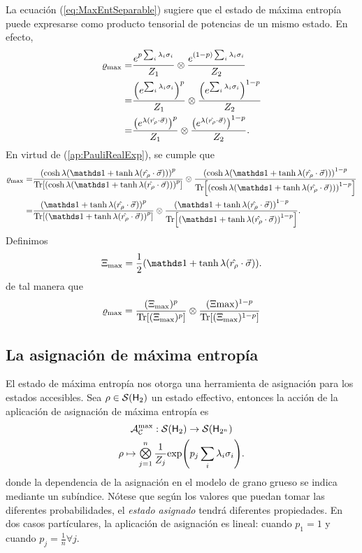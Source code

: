 
La ecuación (\ref{eq:MaxEntSeparable}) sugiere que el estado de máxima entropía puede expresarse como producto tensorial de potencias de un mismo estado. En efecto,
\begin{align*}
  \varrho_{\max}=&\frac{e^{p\sum_{i}\lambda_{i}\sigma_{i}}}{Z_{1}} \otimes \frac{e^{(1-p)\sum_{i}\lambda_{i}\sigma_{i}}}{Z_{2}}\\
  =&\frac{\qty(e^{\sum_{i}\lambda_{i}\sigma_{i}})^{p} }{Z_{1}}\otimes \frac{\qty(e^{\sum_{i}\lambda_{i}\sigma_{i}})^{1-p}}{Z_{2}}\\
  =&\frac{\qty(e^{\lambda(\hat{r_{\rho}}\cdot\vec{\sigma})})^{p}}{Z_{1}} \otimes \frac{\qty(e^{\lambda(\hat{r_{\rho}}\cdot\vec{\sigma})})^{1-p}}{Z_{2}}.
\end{align*}
En virtud de (\ref*{ap:PauliRealExp}), se cumple que
\begin{align*}
  \varrho_{\max}=&\frac{\qty(\cosh{\lambda}(\Id+\tanh{\lambda}(\paulivec{r_{\rho}})))^{p}}{\Tr[\qty(\cosh{\lambda}(\Id+\tanh{\lambda}(\paulivec{r_{\rho}})))^{p}]} \otimes \frac{\qty(\cosh{\lambda}(\Id+\tanh{\lambda}(\paulivec{r_{\rho}})))^{1-p}}{\Tr[\qty(\cosh{\lambda}(\Id+\tanh{\lambda}(\paulivec{r_{\rho}})))^{1-p}]}\\
  =&\frac{\qty(\Id+\tanh{\lambda}(\paulivec{r_{\rho}}))^{p}}{\Tr[\qty(\Id+\tanh{\lambda}(\paulivec{r_{\rho}}))^{p}]} \otimes \frac{\qty(\Id+\tanh{\lambda}(\paulivec{r_{\rho}}))^{1-p}}{\Tr[\qty(\Id+\tanh{\lambda}(\paulivec{r_{\rho}}))^{1-p}]}.
\end{align*}
Definimos
\begin{equation}\label{eq:Xi}
  \Xi_{\max}=\frac{1}{2}(\Id+\tanh{\lambda}(\paulivec{r_{\rho}})).
\end{equation}
de tal manera que 
\begin{equation}\label{eq:MaxEntSeparablePower}
  \varrho_{\max}=\frac{(\Xi_{\max})^{p}}{\Tr[ (\Xi_{\max})^{p}]}\otimes\frac{(\Xi{\max})^{1-p}}{\Tr[(\Xi_{\max})^{1-p}]}
\end{equation}

\subsection{La asignación de máxima entropía}

El estado de máxima entropía nos otorga una herramienta de asignación para los estados accesibles. Sea $\rho\in\mathcal{S}({\sf H}_{2})$ un estado effectivo, entonces la acción de la aplicación de asignación de máxima entropía es
\begin{gather*}
    \mcA_{\mcC}^{\max}:\densityspace{2}\rightarrow\densityspace{2^{n}}\\
    \rho \mapsto \Motimes_{j=1}^{n}\frac{1}{Z_{j}}\text{exp}\qty(p_{j}\sum_{i}\lambda_{i}\sigma_{i}).
\end{gather*}
donde la dependencia de la asignación en el modelo de grano grueso se indica mediante un subíndice. Nótese que según los valores que puedan tomar las diferentes probabilidades, el \textit{estado asignado} tendrá diferentes propiedades. En dos casos partículares, la aplicación de asignación es lineal: cuando $p_{1}=1$ y cuando $p_{j}=\frac{1}{n}\forall j$.

